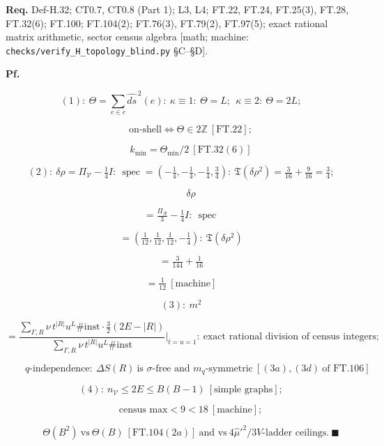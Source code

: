 \begin{theorem}
\textbf{Req.} Def-H.32; CT0.7, CT0.8 (Part 1); L3, L4; FT.22, FT.24, FT.25(3), FT.28, FT.32(6); FT.100; FT.104(2); FT.76(3), FT.79(2), FT.97(5); exact rational matrix arithmetic, sector census algebra [math; machine: \texttt{checks/\allowbreak{}verify\_\allowbreak{}H\_\allowbreak{}topology\_\allowbreak{}blind.py} §C–§D].

\textbf{Pf.}

\[
(1):\ \Theta=\sum_{e\in c}\widehat{ds}^{\,2}(e):\ \kappa\equiv1:\ \Theta=L;\ \ \kappa\equiv2:\ \Theta=2L;
\]

\[
\qquad \text{on-shell}\iff\Theta\in2\mathbb Z\ [\mathrm{FT.22}];
\]

\[
\qquad k_{\min}=\Theta_{\min}/2\ [\mathrm{FT.32}(6)]
\]

\[
(2):\ \delta\rho=\Pi_{\mathcal V}-\tfrac14I:\ \operatorname{spec}=(-\tfrac14,-\tfrac14,-\tfrac14,\tfrac34):\ \mathfrak T(\delta\rho^2)=\tfrac3{16}+\tfrac9{16}=\tfrac34;
\]

\[
\qquad \delta\rho
\]

\[
= \tfrac{\Pi_{\mathcal R}}3-\tfrac14I:\ \operatorname{spec}
\]

\[
= (\tfrac1{12},\tfrac1{12},\tfrac1{12},-\tfrac14):\ \mathfrak T(\delta\rho^2)
\]

\[
= \tfrac3{144}+\tfrac1{16}
\]

\[
= \tfrac1{12}\ [\text{machine}]
\]

\[
(3):\ m^2
\]

\[
= \frac{\sum_{\Gamma,R}\nu\,t^{|R|}u^{L}\#\mathrm{inst}\cdot\tfrac32(2E-|R|)}{\sum_{\Gamma,R}\nu\,t^{|R|}u^{L}\#\mathrm{inst}}\Bigg|_{t=u=1}:\ \text{exact rational division of census integers};
\]

\[
\qquad q\text{-independence}:\ \Delta S(R)\ \text{is }\sigma\text{-free and }m_q\text{-symmetric}\ [(3a),(3d)\ \text{of FT.106}]
\]

\[
(4):\ n_{\mathcal V}\le2E\le B(B-1)\ [\text{simple graphs}];
\]

\[
\qquad \text{census max}<9<18\ [\text{machine}];
\]

\[
\qquad \Theta(B^2)\ \text{vs}\ \Theta(B)\ [\mathrm{FT.104}(2a)]\ \text{and vs}\ 4\hat\mu'^2/3V\text{-ladder ceilings}.\ \blacksquare
\]


\end{theorem}
